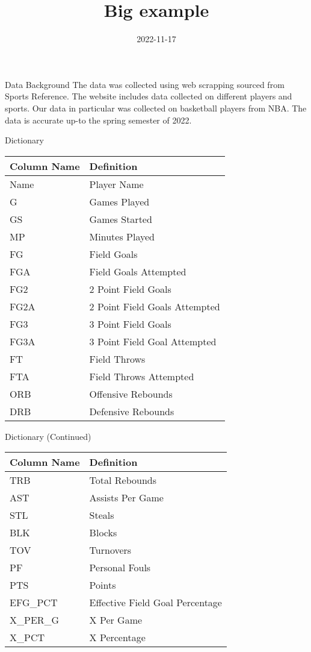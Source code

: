 \documentclass[
  ignorenonframetext,
]{beamer}
\title{Big example}
\author{}
\date{\vspace{-2.5em}2022-11-17}
\begin{document}
\frame{\titlepage}

\begin{frame}{Data Background}
\protect\hypertarget{data-background}{}
The data was collected using web scrapping sourced from Sports
Reference. The website includes data collected on different players and
sports. Our data in particular was collected on basketball players from
NBA. The data is accurate up-to the spring semester of 2022.
\end{frame}

\begin{frame}{Dictionary}
\protect\hypertarget{dictionary}{}
\begin{longtable}[]{@{}ll@{}}
\toprule()
Column Name & Definition \\
\midrule()
\endhead
Name & Player Name \\
G & Games Played \\
GS & Games Started \\
MP & Minutes Played \\
FG & Field Goals \\
FGA & Field Goals Attempted \\
FG2 & 2 Point Field Goals \\
FG2A & 2 Point Field Goals Attempted \\
FG3 & 3 Point Field Goals \\
FG3A & 3 Point Field Goal Attempted \\
FT & Field Throws \\
FTA & Field Throws Attempted \\
ORB & Offensive Rebounds \\
DRB & Defensive Rebounds \\
\bottomrule()
\end{longtable}
\end{frame}

\begin{frame}{Dictionary (Continued)}
\protect\hypertarget{dictionary-continued}{}
\begin{longtable}[]{@{}ll@{}}
\toprule()
Column Name & Definition \\
\midrule()
\endhead
TRB & Total Rebounds \\
AST & Assists Per Game \\
STL & Steals \\
BLK & Blocks \\
TOV & Turnovers \\
PF & Personal Fouls \\
PTS & Points \\
EFG\_PCT & Effective Field Goal Percentage \\
X\_PER\_G & X Per Game \\
X\_PCT & X Percentage \\
\bottomrule()
\end{longtable}
\end{frame}
\end{document}
